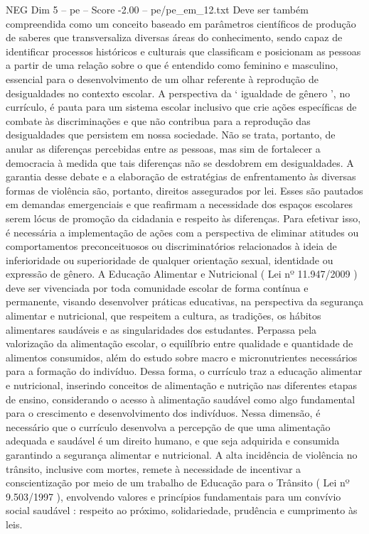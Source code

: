 \begin{textsample}{NEG Dim 5 – pe – Score -2.00 – pe/pe\_em\_12.txt}
Deve ser também compreendida como um conceito baseado em parâmetros científicos de produção de saberes que transversaliza diversas áreas do conhecimento, sendo capaz de identificar processos históricos e culturais que classificam e posicionam as pessoas a partir de uma relação sobre o que é entendido como feminino e masculino, essencial para o desenvolvimento de um olhar referente à reprodução de desigualdades no contexto escolar.
A perspectiva da ‘ igualdade de gênero ’, no currículo, é pauta para um sistema escolar inclusivo que crie ações específicas de combate às discriminações e que não contribua para a reprodução das desigualdades que persistem em nossa sociedade.
Não se trata, portanto, de anular as diferenças percebidas entre as pessoas, mas sim de fortalecer a democracia à medida que tais diferenças não se desdobrem em desigualdades.
A garantia desse debate e a elaboração de estratégias de enfrentamento às diversas formas de violência são, portanto, direitos assegurados por lei.
Esses são pautados em demandas emergenciais e que reafirmam a necessidade dos espaços escolares serem lócus de promoção da cidadania e respeito às diferenças.
Para efetivar isso, é necessária a implementação de ações com a perspectiva de eliminar atitudes ou comportamentos preconceituosos ou discriminatórios relacionados à ideia de inferioridade ou superioridade de qualquer orientação sexual, identidade ou expressão de gênero.
A Educação Alimentar e Nutricional ( Lei nº 11.947/2009 ) deve ser vivenciada por toda comunidade escolar de forma contínua e permanente, visando desenvolver práticas educativas, na perspectiva da segurança alimentar e nutricional, que respeitem a cultura, as tradições, os hábitos alimentares saudáveis e as singularidades dos estudantes.
Perpassa pela valorização da alimentação escolar, o equilíbrio entre qualidade e quantidade de alimentos consumidos, além do estudo sobre macro e micronutrientes necessários para a formação do indivíduo.
Dessa forma, o currículo traz a educação alimentar e nutricional, inserindo conceitos de alimentação e nutrição nas diferentes etapas de ensino, considerando o acesso à alimentação saudável como algo fundamental para o crescimento e desenvolvimento dos indivíduos.
Nessa dimensão, é necessário que o currículo desenvolva a percepção de que uma alimentação adequada e saudável é um direito humano, e que seja adquirida e consumida garantindo a segurança alimentar e nutricional.
A alta incidência de violência no trânsito, inclusive com mortes, remete à necessidade de incentivar a conscientização por meio de um trabalho de Educação para o Trânsito ( Lei nº 9.503/1997 ), envolvendo valores e princípios fundamentais para um convívio social saudável : respeito ao próximo, solidariedade, prudência e cumprimento às leis.

\end{textsample}
